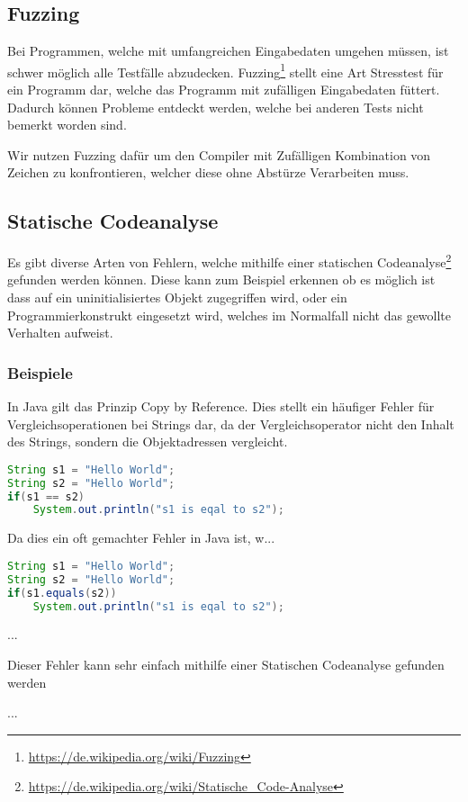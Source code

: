 \subsection{Fuzzing}

Bei Programmen, welche mit umfangreichen Eingabedaten umgehen m\"ussen, ist schwer m\"oglich alle Testf\"alle abzudecken. Fuzzing\footnote{\url{https://de.wikipedia.org/wiki/Fuzzing}} stellt eine Art Stresstest f\"ur ein Programm dar, welche das Programm mit zuf\"alligen Eingabedaten f\"uttert. Dadurch k\"onnen Probleme entdeckt werden, welche bei anderen Tests nicht bemerkt worden sind.

Wir nutzen Fuzzing daf\"ur um den Compiler mit Zuf\"alligen Kombination von Zeichen zu konfrontieren, welcher diese ohne Abst\"urze Verarbeiten muss.

\subsection{Statische Codeanalyse}

Es gibt diverse Arten von Fehlern, welche mithilfe einer statischen Codeanalyse\footnote{\url{https://de.wikipedia.org/wiki/Statische_Code-Analyse}} gefunden werden k\"onnen. Diese kann zum Beispiel erkennen ob es m\"oglich ist dass auf ein uninitialisiertes Objekt zugegriffen wird, oder ein Programmierkonstrukt eingesetzt wird, welches im Normalfall nicht das gewollte Verhalten aufweist.


\subsubsection{Beispiele}


In Java gilt das Prinzip Copy by Reference. Dies stellt ein h\"aufiger Fehler f\"ur Vergleichsoperationen bei Strings dar, da der Vergleichsoperator nicht den Inhalt des Strings, sondern die Objektadressen vergleicht.

\begin{lstlisting}[language=Java]
String s1 = "Hello World";
String s2 = "Hello World";
if(s1 == s2)
	System.out.println("s1 is eqal to s2");
\end{lstlisting}

Da dies ein oft gemachter Fehler in Java ist, w...

\begin{lstlisting}[language=Java]
String s1 = "Hello World";
String s2 = "Hello World";
if(s1.equals(s2))
	System.out.println("s1 is eqal to s2");
\end{lstlisting}


...

Dieser Fehler kann sehr einfach mithilfe einer Statischen Codeanalyse gefunden werden

...